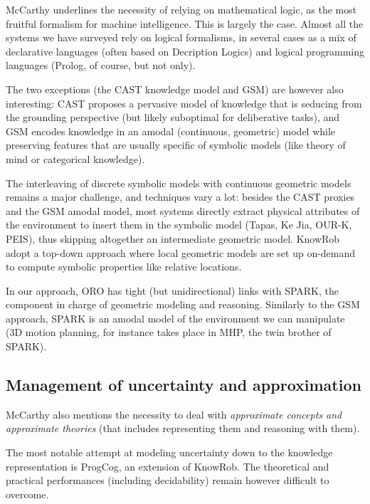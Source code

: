 \documentclass[a4paper, twocolumn]{article}
\begin{document}
McCarthy underlines the necessity of relying on mathematical logic, as the most
fruitful formalism for machine intelligence. This is largely the case. Almost
all the systems we have surveyed rely on logical formalisms, in several cases
as a mix of declarative languages (often based on Decription Logics) and
logical programming languages (Prolog, of course, but not only).

The two exceptions (the CAST knowledge model and GSM) are however also
interesting: CAST proposes a pervasive model of knowledge that is seducing from
the grounding perspective (but likely suboptimal for deliberative tasks), and
GSM encodes knowledge in an amodal (continuous, geometric) model while
preserving features that are usually specific of symbolic models (like theory
of mind or categorical knowledge).

The interleaving of discrete symbolic models with continuous geometric models
remains a major challenge, and techniques vary a lot: besides the CAST proxies
and the GSM amodal model, most systems directly extract physical attributes of
the environment to insert them in the symbolic model ({\sc Tapas}, Ke Jia,
OUR-K, PEIS), thus skipping altogether an intermediate geometric model. {\sc KnowRob}
adopt a top-down approach where local geometric models are set up on-demand to
compute symbolic properties like relative locations.

In our approach, ORO has tight (but unidirectional) links with SPARK, the
component in charge of geometric modeling and reasoning. Similarly to the GSM
approach, SPARK is an amodal model of the environment we can manipulate (3D
motion planning, for instance takes place in MHP, the twin brother of SPARK).

\subsection{Management of uncertainty and approximation}

McCarthy also mentions the necessity to deal with \emph{approximate concepts
and approximate theories} (that includes representing them and reasoning with
them).

The most notable attempt at modeling uncertainty down to the knowledge
representation is {\sc ProgCog}, an extension of {\sc KnowRob}. The theoretical
and practical performances (including decidability) remain however difficult to
overcome.
\end{document}
